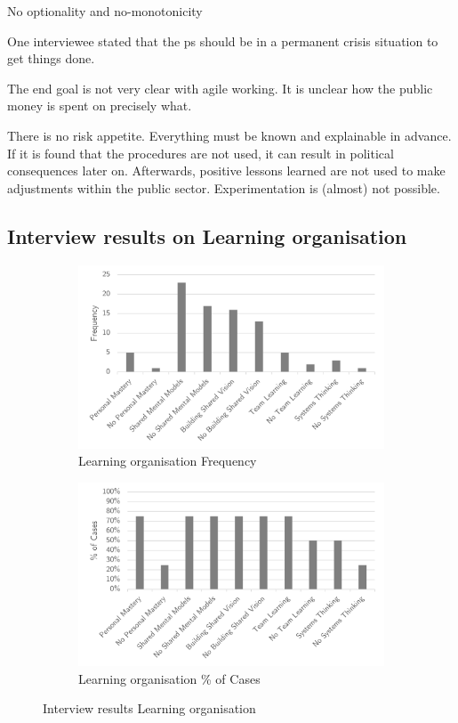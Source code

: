No optionality and no-monotonicity


One interviewee stated that the \gls{ps} should be in a permanent crisis situation to get things done.

The end goal is not very clear with \gls{agile} working. It is unclear how the public money is spent on precisely what. 



There is no risk appetite. Everything must be known and explainable in advance. If it is found that the procedures are not used, it can result in political consequences later on. Afterwards, positive lessons learned are not used to make adjustments within the public sector. Experimentation is (almost) not possible.

\subsection{Interview results on Learning organisation}
\label{sub:interviewresultslearning}
\begin{figure}[H]
	\centering
	\begin{subfigure}[H]{0.5\textwidth}
		\centering
		\includegraphics[width=0.95\linewidth]{images/learningorganisation_frequency}
		\caption{Learning organisation Frequency}
		\label{fig:learningfrequency}
	\end{subfigure}%
	\begin{subfigure}[H]{0.5\textwidth}
		\centering
		\includegraphics[width=0.95\linewidth]{images/learningorganisation_cases}
		\caption{Learning organisation \% of Cases}
		\label{fig:learningcases}
	\end{subfigure}
	\caption{Interview results Learning organisation}
	\label{fig:interviewlearningorganisation}
\end{figure}

